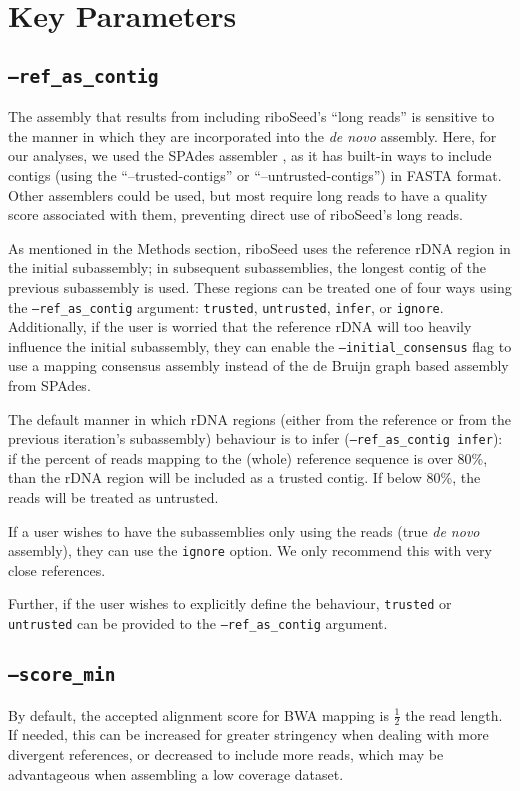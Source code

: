 \section*{Key Parameters}
\subsection*{\texttt{--ref\_as\_contig}}
The assembly that results from including riboSeed's ``long reads'' is sensitive to the manner in which they are incorporated into the \textit{de novo} assembly. Here, for our analyses, we used the SPAdes assembler \cite{Bankevich2012}, as it has built-in ways to include contigs (using the ``--trusted-contigs'' or ``--untrusted-contigs'') in FASTA format.  Other assemblers could be used, but most require long reads to have a quality score associated with them, preventing direct use of riboSeed's long reads.

As mentioned in the Methods section, riboSeed uses the reference rDNA region in the initial subassembly;  in subsequent subassemblies, the longest contig of the previous subassembly is used.  These regions can be treated one of four ways using the \texttt{--ref\_as\_contig} argument: \texttt{trusted}, \texttt{untrusted}, \texttt{infer}, or \texttt{ignore}.  Additionally, if the user is worried that the reference rDNA will too heavily influence the initial subassembly, they can enable the \texttt{--initial\_consensus} flag to use a mapping consensus assembly instead of the de Bruijn graph based assembly from SPAdes.

The default manner in which rDNA regions (either from the reference or from the previous iteration's subassembly) behaviour is to infer (\texttt{--ref\_as\_contig infer}): if the percent of reads mapping to  the (whole) reference sequence  is over 80\%, than the rDNA region will be included as a trusted contig.  If below 80\%, the reads will be treated as untrusted.

If a user wishes to have the subassemblies only using the reads (true \textit{de novo} assembly), they can use the \texttt{ignore} option.  We only recommend this with very close references.

Further, if the user wishes to explicitly define the behaviour, \texttt{trusted} or \texttt{untrusted} can be provided to the \texttt{--ref\_as\_contig} argument.

\subsection*{\texttt{--score\_min}}
By default, the accepted alignment score for BWA mapping is $\frac{1}{2}$ the read length.  If needed, this can be increased for greater stringency when dealing with more divergent references, or decreased to include more reads, which may be advantageous when assembling a low coverage dataset.
